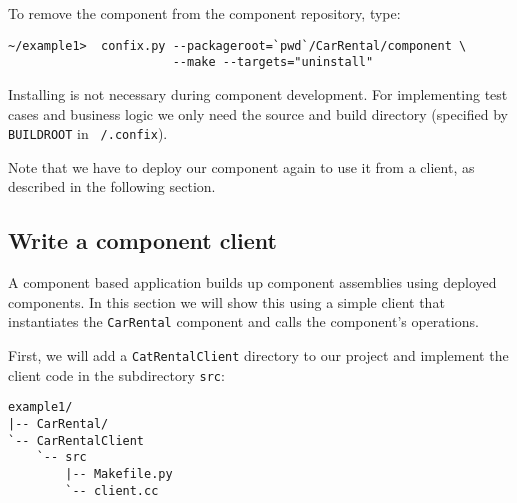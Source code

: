To remove the component from the component repository, type:

\begin{small}
\begin{verbatim}
~/example1>  confix.py --packageroot=`pwd`/CarRental/component \
                       --make --targets="uninstall" 
\end{verbatim}
\end{small}

Installing is not necessary during component development. 
For implementing test cases and business logic we only need the source and
build directory (specified by {\tt BUILDROOT} in {\tt ~/.confix}).
 
Note that we have to deploy our component again to use it from a client,
as described in the following section. 



\newpage
\subsection{Write a component client}

A component based application builds up component assemblies using deployed 
components. In this section we will show this using a simple client that
instantiates the {\tt CarRental} component and calls the component's operations.

First, we will add a {\tt CatRentalClient} directory to our project and implement
the client code in the subdirectory {\tt src}:
\begin{small}
\begin{verbatim}
example1/
|-- CarRental/
`-- CarRentalClient
    `-- src
        |-- Makefile.py
        `-- client.cc
\end{verbatim}
\end{small}

